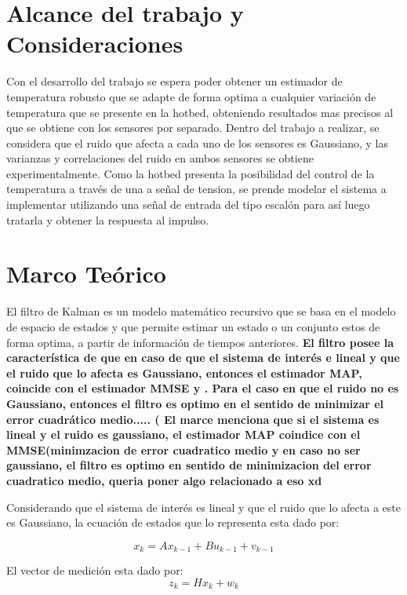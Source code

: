 \documentclass[journal]{IEEEtran}
\begin{document}
\section{Alcance del trabajo y Consideraciones}
Con el desarrollo del trabajo se espera poder obtener un estimador de temperatura robusto que se adapte de 
forma optima a cualquier variación de temperatura que se presente en la hotbed, obteniendo resultados mas 
precisos al que se obtiene con los sensores por separado.
Dentro del trabajo a realizar, se considera que el ruido que afecta a cada uno de los sensores es Gaussiano, 
y las varianzas y correlaciones del ruido en ambos sensores se obtiene experimentalmente. Como la hotbed 
presenta la posibilidad del control de la temperatura a través de una a señal de tension, se prende modelar 
el sistema a implementar utilizando una señal de entrada del tipo escalón para así luego tratarla y obtener 
la respuesta al impulso.

\section{Marco Teórico}
El filtro de Kalman es un modelo matemático recursivo que se basa en el modelo de espacio de estados y que 
permite estimar un estado o un conjunto estos de forma optima, a partir de  información de tiempos anteriores. 
\textbf{El filtro posee la característica de que en caso de que el sistema de interés e lineal y que el ruido 
que lo afecta es Gaussiano, entonces el estimador MAP, coincide con el estimador MMSE y . Para el caso en que 
el ruido no es Gaussiano, entonces el filtro es optimo en el sentido de minimizar el error cuadrático medio.....
( El marce menciona que si el sistema es lineal y el ruido es gaussiano, el estimador MAP coindice con el 
MMSE(minimzacion de error cuadratico medio y en caso no ser gaussiano, el filtro es optimo en sentido de 
minimizacion del error cuadratico medio, queria poner algo relacionado a eso xd}

Considerando que el sistema de interés es lineal y que el ruido que lo afecta a este es Gaussiano, la ecuación 
de estados que lo representa esta dado por: 

\begin{equation}
x_{k}=Ax_{k-1}+Bu_{k-1}+v_{k-1}
\label{eq:1}
\end{equation}


El vector de medición esta dado por:
\begin{equation}
z_{k}=Hx_{k}+w_{k}
\label{eq:2}
\end{equation}
\end{document}
